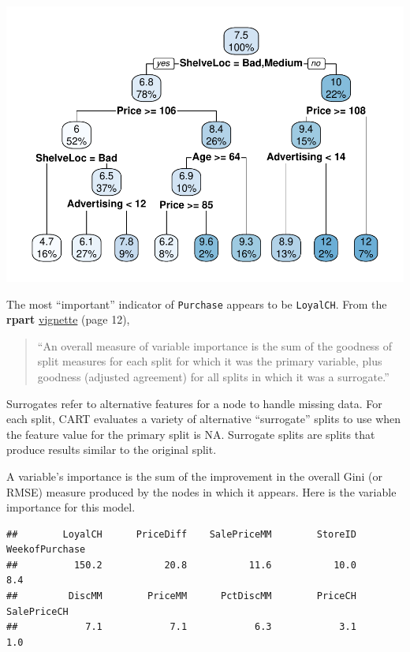 \documentclass[
]{book}
\newenvironment{Shaded}{\begin{snugshade}}{\end{snugshade}}
\newcommand{\NormalTok}[1]{#1}
\newcommand{\OperatorTok}[1]{\textcolor[rgb]{0.81,0.36,0.00}{\textbf{#1}}}
\begin{document}
\includegraphics{data-sci_files/figure-latex/unnamed-chunk-67-1.pdf}

The most ``important'' indicator of \texttt{Purchase} appears to be \texttt{LoyalCH}. From the \textbf{rpart} \href{https://cran.r-project.org/web/packages/rpart/vignettes/longintro.pdf}{vignette} (page 12),

\begin{quote}
``An overall measure of variable importance is the sum of the goodness of split measures for each split for which it was the primary variable, plus goodness (adjusted agreement) for all splits in which it was a surrogate.''
\end{quote}

Surrogates refer to alternative features for a node to handle missing data. For each split, CART evaluates a variety of alternative ``surrogate'' splits to use when the feature value for the primary split is NA. Surrogate splits are splits that produce results similar to the original split.

A variable's importance is the sum of the improvement in the overall Gini (or RMSE) measure produced by the nodes in which it appears. Here is the variable importance for this model.

\begin{Shaded}
\end{Shaded}

\begin{verbatim}
##        LoyalCH      PriceDiff    SalePriceMM        StoreID WeekofPurchase 
##          150.2           20.8           11.6           10.0            8.4 
##         DiscMM        PriceMM      PctDiscMM        PriceCH    SalePriceCH 
##            7.1            7.1            6.3            3.1            1.0
\end{verbatim}
\end{document}
